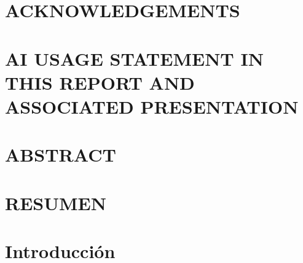 \documentclass[pdftex,spanish]{pucthesis}	%
\begin{document}
 \label{acknowledgements} %
\chapter*{ACKNOWLEDGEMENTS}           


\chapter*{
AI USAGE STATEMENT IN THIS REPORT AND ASSOCIATED PRESENTATION}           


\cleardoublepage



\tableofcontents
{} \label{listoffigures}
\listoffigures
{} \label{listoftables}
\listoftables
\cleardoublepage



 \label{abstract}
\chapter*{ABSTRACT}

\cleardoublepage

 \label{resumen}
\chapter*{RESUMEN}

\cleardoublepage



\chapter[INTRODUCCIÓN]{Introducción}

\end{document}

